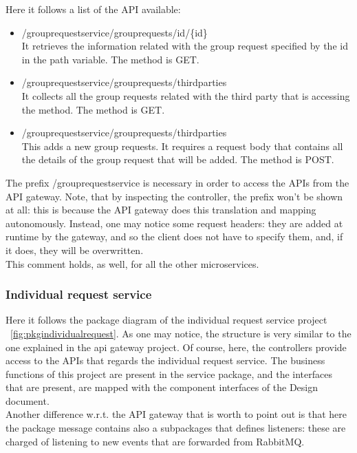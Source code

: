 Here it follows a list of the API available:
\begin{itemize}

\item /grouprequestservice/grouprequests/id/\{id\} \\
It retrieves the information related with the group request specified by the id in the
path variable. 
The method is GET.

\item /grouprequestservice/grouprequests/thirdparties \\
It collects all the group requests related with the third party that is accessing the method. 
The method is GET.

\item /grouprequestservice/grouprequests/thirdparties \\
This adds a new group requests. It requires a request body that contains all the details of the group
request that will be added.
The method is POST.

\end{itemize}

The prefix /grouprequestservice is necessary in order to access the APIs from the API gateway. 
Note, that by inspecting the controller, the prefix won't be shown at all: this is because the API gateway does this translation 
and mapping autonomously. Instead, one may notice some request headers: they are added at runtime by the gateway, and so the client
does not have to specify them, and, if it does, they will be overwritten. \\
This comment holds, as well, for all the other microservices.


\subsubsection{Individual request service}
Here it follows the package diagram of the individual request service project ~\ref{fig:pkgindividualrequest}. 
As one may notice, the structure is very similar to the one explained in the api gateway project. 
Of course, here, the controllers provide access to the APIs that regards the individual request service. 
The business functions of this project are present in the  service package, and the interfaces that are present, 
are mapped with the component interfaces of the Design document. \\
Another difference w.r.t. the API gateway that is worth to point out is that here the package message contains also a subpackages that
defines listeners: these are charged of listening to new events that are forwarded from RabbitMQ. 

